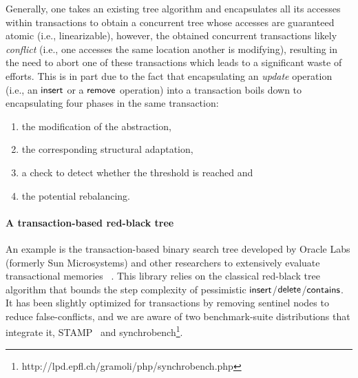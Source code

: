 Generally, one takes an existing tree algorithm and encapsulates all its accesses within transactions 
to obtain a concurrent 
tree whose accesses are guaranteed atomic (i.e., linearizable), however, 
the obtained concurrent transactions likely \emph{conflict} (i.e., one accesses the same 
location another is modifying), resulting in the need to abort one of these transactions which leads to  a significant waste of efforts.
This is in part due to the fact that encapsulating an \emph{update} operation (i.e., an $\act{insert}$ or a $\act{remove}$ operation)
into a transaction boils down to encapsulating four phases in the same transaction:
\begin{enumerate}
	\item the modification of the abstraction, 
	\item the corresponding structural adaptation,
	\item a check to detect whether the threshold is reached and 
	\item the potential rebalancing.
\end{enumerate}

\paragraph{A transaction-based red-black tree}
An example is the transaction-based binary search tree developed by Oracle Labs (formerly Sun Microsystems) and other researchers 
to extensively evaluate transactional memories~\cite{DSS06,HLMS03,CCKO08,HK08,FFR08,YNW+08,DFGG11} .
This library relies on the classical red-black tree algorithm that bounds the step complexity of pessimistic $\act{insert}$/$\act{delete}$/$\act{contains}$.
It has been slightly optimized for transactions by removing sentinel nodes to reduce false-conflicts, and we are aware of 
two benchmark-suite distributions that integrate it, STAMP~\cite{CCKO08} and synchrobench\footnote{http://lpd.epfl.ch/gramoli/php/synchrobench.php}.


